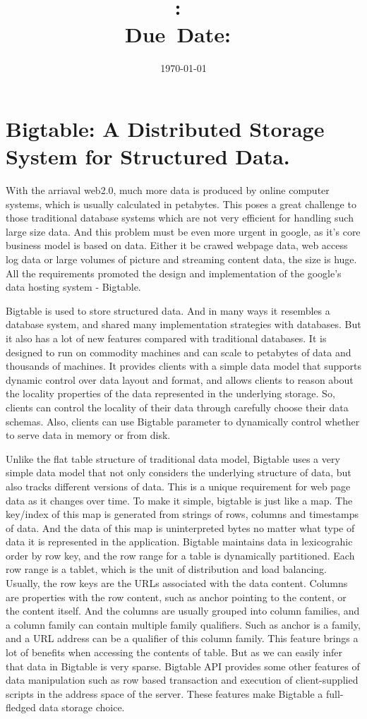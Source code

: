 \documentclass[24pt]{article}
\title{\textmd{\textbf{\hmwkClass:\
      \hmwkTitle}}\\\normalsize\small{Due\ Date:\
    \hmwkDueDate}\\}
\date{\today}
\author{\textbf{\hmwkAuthorName}}
\begin{document}
\maketitle

\section*{Bigtable: A Distributed Storage System for
  Structured Data.}
With the arriaval web2.0, much more data is produced by online
computer systems, which is usually calculated in petabytes. This poses
a great challenge to those traditional database 
systems which are not very efficient for handling such large size
data. And this problem must be even more urgent in google, as it's core
business model is based on data. Either it be crawed
webpage data, web access log data or large volumes of picture and
streaming content data, the size is huge. All the requirements
promoted the design and implementation of the google's data hosting
system - Bigtable. 

Bigtable is used to store structured data. And in many ways it
resembles a database system, and shared many implementation strategies
with databases. But it also has a lot of new features compared
with traditional databases. It is designed to run on commodity
machines and can scale to petabytes of data and thousands of
machines. It provides clients with a simple data model that supports
dynamic control over data layout and format, and allows clients to
reason about the locality properties of the data represented in the
underlying storage. So, clients can control the locality of their data
through carefully choose their data schemas. Also, clients can use
Bigtable parameter to dynamically control whether to serve data in 
memory or from disk. 

Unlike the flat table structure of traditional data model, Bigtable
uses a very simple data model that not only considers the underlying
structure of data, but also tracks different versions of data. This is
a unique requirement for web page data as it changes over
time. To make it simple, bigtable is just like a map. The key/index of
this map is generated from strings of rows, columns and timestamps
of data. And the data of this map is uninterpreted bytes no matter
what type of data it is represented in the application. Bigtable
maintains data in lexicograhic order by row key, and the row range for
a table is dynamically partitioned. Each row range is a tablet, which
is the unit of distribution and load balancing. Usually, the row keys
are the URLs associated with the data content. Columns are properties
with the row content, such as anchor pointing to the content, or the
content itself. And the columns are usually grouped into column
families, and a column family can contain multiple family
qualifiers. Such as anchor is a family, and a URL address can be a
qualifier of this column family. This feature brings a lot of
benefits when accessing the contents of table. But as we can easily
infer that data in Bigtable is very sparse. Bigtable API provides some
other features of data manipulation such as row based transaction and
execution of client-supplied scripts in the address space of the
server. These features make Bigtable a full-fledged data storage
choice. 
\end{document}
